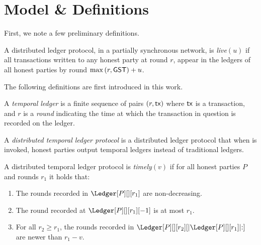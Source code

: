\section{Model \& Definitions}


First, we note a few preliminary definitions.



\begin{definition}
  A distributed ledger protocol, in a partially synchronous network,
  is \emph{live}$(u)$ if all transactions written to any honest party
  at round $r$, appear in the ledgers of all honest parties by round %
  $\max{(r,\textsf{GST})} + u$.
\end{definition}


The following definitions are first introduced in this work.

\begin{definition}
  A \emph{temporal ledger} is a finite sequence of pairs $(r, \textsf{tx})$ where $\textsf{tx}$ is
  a transaction, and $r$ is a \emph{round} indicating the time at which
  the transaction in question is recorded on the ledger.
\end{definition}

\begin{definition}
  A \emph{distributed temporal ledger protocol} is a distributed ledger protocol
  that when \rread is invoked, honest parties output temporal ledgers instead of traditional ledgers.
\end{definition}

\begin{definition}[Timely]\label{def:timely}
  A distributed temporal ledger protocol is \emph{timely}$(v)$
  if for all honest parties $P$ and rounds $r_1$ it holds that:

  \begin{enumerate}
    \item The rounds recorded in $\Ledger[P][][r_1]$ are non-decreasing.\label{def:timely-increasing}
    \item The round recorded at $\Ledger[P][][r_1][-1]$ is at most $r_1$.\label{def:timely-past}
    \item For all $r_2 \geq r_1$, the rounds recorded in $\Ledger[P][][r_2][|\Ledger[P][][r_1]|{:}]$ are
          newer than $r_1 - v$.\label{def:timely-chunk}
  \end{enumerate}
\end{definition}

